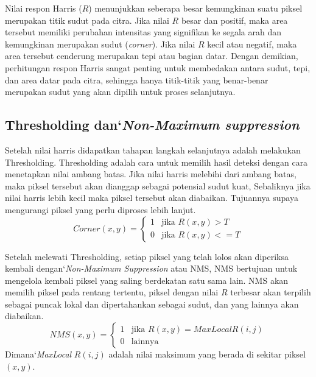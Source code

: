     Nilai respon Harris (\(R\)) menunjukkan seberapa besar kemungkinan suatu piksel merupakan titik sudut pada citra. Jika nilai \(R\) besar dan positif, maka area tersebut memiliki perubahan intensitas yang signifikan ke segala arah dan kemungkinan merupakan sudut (\emph{corner}). Jika nilai \(R\) kecil atau negatif, maka area tersebut cenderung merupakan tepi atau bagian datar. Dengan demikian, perhitungan respon Harris sangat penting untuk membedakan antara sudut, tepi, dan area datar pada citra, sehingga hanya titik-titik yang benar-benar merupakan sudut yang akan dipilih untuk proses selanjutnya.

\subsection{Thresholding dan`\emph{Non-Maximum suppression}}
    Setelah nilai harris didapatkan tahapan langkah selanjutnya adalah melakukan Thresholding.
Thresholding adalah cara untuk memilih hasil deteksi dengan cara menetapkan nilai ambang batas.
Jika nilai harris melebihi dari ambang batas, maka piksel tersebut akan dianggap sebagai potensial sudut kuat, Sebaliknya jika nilai harris lebih kecil maka piksel tersebut akan diabaikan.
Tujuannya supaya mengurangi piksel yang perlu diproses lebih lanjut.
\begin{equation}
    Corner(x,y) = 
    \begin{cases}  
        1 & \text{jika } R(x,y) > T \\ 
        0 & \text{jika } R(x,y) <= T
    \end{cases}
\end{equation}

    Setelah melewati Thresholding, setiap piksel yang telah lolos akan diperiksa kembali dengan`\emph{Non-Maximum Suppression} atau NMS,
NMS bertujuan untuk mengelola kembali piksel yang saling berdekatan satu sama lain. NMS akan memilih piksel pada rentang tertentu, piksel dengan nilai \(R\) terbesar akan terpilih sebagai puncak lokal dan dipertahankan sebagai sudut, dan yang lainnya akan diabaikan.
\begin{equation*}
    NMS(x,y) =
    \begin{cases}
        1 & \text{jika } R(x,y) = MaxLocal R(i,j) \\
        0 & \text{lainnya }
    \end{cases}
\end{equation*}
Dimana`\emph{MaxLocal} \(R(i,j)\) adalah nilai maksimum yang berada di sekitar piksel \((x,y)\).

